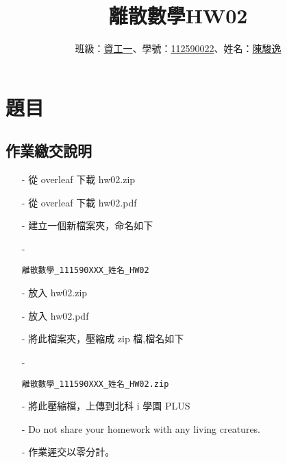 \documentclass[sigconf]{acmart}
\begin{document}
\title{離散數學HW02}

\author{班級：\underline{資工一}、學號：\underline{112590022}、姓名：\underline{陳駿逸}}
\orcid{}
\affiliation{%
  \institution{}
  \city{}
  \country{}
}

\maketitle

\section{題目}
\subsection{作業繳交說明}
\begin{shaded}
\begin{itemize}
    \item[-] 從 overleaf 下載 hw02.zip
    \item[-] 從 overleaf 下載 hw02.pdf
    \item[-] 建立一個新檔案夾，命名如下
    \item[-] \color{red}\begin{verbatim}離散數學_111590XXX_姓名_HW02\end{verbatim}\color{black}
    \item[-] 放入 hw02.zip
    \item[-] 放入 hw02.pdf
    \item[-] 將此檔案夾，壓縮成 zip 檔,檔名如下
    \item[-] \color{red}\begin{verbatim}離散數學_111590XXX_姓名_HW02.zip\end{verbatim}\color{black}
    \item[-] 將此壓縮檔，上傳到北科 i 學園 PLUS
    \item[-] Do not share your homework with any living creatures.
    \item[-] 作業遲交以零分計。
\end{itemize}
\end{shaded}


\end{document}
